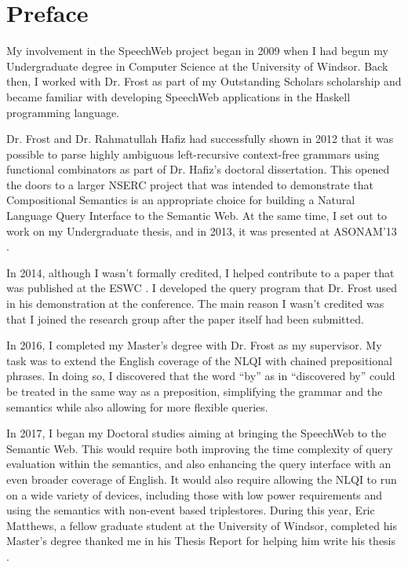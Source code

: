 \documentclass[../main.tex]{subfiles}
\begin{document}
\chapter{Preface}
\begin{refsection}
    My involvement in the SpeechWeb project began in 2009 when I had begun my Undergraduate
    degree in Computer Science at the University of Windsor.  Back then, I worked with Dr. Frost as part of my Outstanding Scholars scholarship and became familiar with developing SpeechWeb applications in the Haskell programming language.

    Dr. Frost and Dr. Rahmatullah Hafiz had successfully shown in 2012 that it was possible to parse highly ambiguous left-recursive context-free grammars using functional combinators as part of Dr. Hafiz's doctoral dissertation. This opened the doors to a larger NSERC project
    that was intended to demonstrate that Compositional Semantics is an appropriate choice
    for building a Natural Language Query Interface to the Semantic Web.  At the same time, I set out
    to work on my Undergraduate thesis, and in 2013, it was presented at ASONAM'13 \cite{donais2013system}.

    In 2014, although I wasn't formally credited, I helped contribute to a paper that was published at the ESWC \cite{frost2014demonstration}.  I developed the query program that Dr. Frost used in his demonstration at the conference.  The main reason I wasn't credited was that I joined the research group after the paper itself had been submitted.

    In 2016, I completed my Master's degree with Dr. Frost as my supervisor.  My task was to extend the English coverage of the NLQI with chained prepositional phrases.  In doing so, I discovered that the word ``by'' as in ``discovered by'' could be treated in the same way as a preposition, simplifying the grammar and the semantics while also allowing for more flexible queries.

    In 2017, I began my Doctoral studies aiming at bringing the SpeechWeb to the Semantic Web.
    This would require both improving the time complexity of query evaluation within the semantics, and also enhancing the query interface with an even broader coverage of English.  It would also require allowing the NLQI to run on a wide variety of devices, including those with low power requirements and using the semantics with non-event based triplestores.  During this year, Eric Matthews, a fellow graduate student at the University of Windsor, completed his Master's degree thanked me in his Thesis Report for helping him write his thesis \cite{matthews2017passive}.


\end{refsection}
\end{document}
